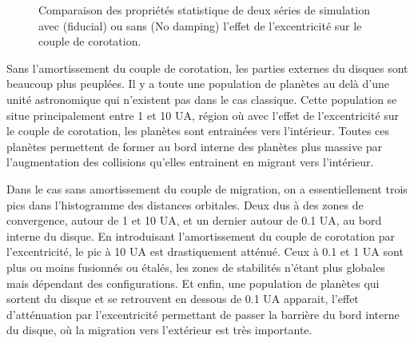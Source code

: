 \begin{figure}[htb]
\centering
{}\hfill
{}
\caption{Comparaison des propriétés statistique de deux séries de simulation avec (fiducial) ou sans (No damping) l'effet de l'excentricité sur le couple de corotation.}\label{fig:HSE_no_damping}
\end{figure}

Sans l'amortissement du couple de corotation, les parties externes du disques sont beaucoup plus peuplées. Il y a toute une population de planètes au delà d'une unité astronomique qui n'existent pas dans le cas classique. Cette population se situe principalement entre 1 et 10 UA, région où avec l'effet de l'excentricité sur le couple de corotation, les planètes sont entrainées vers l'intérieur. Toutes ces planètes permettent de former au bord interne des planètes plus massive par l'augmentation des collisions qu'elles entrainent en migrant vers l'intérieur. 

Dans le cas sans amortissement du couple de migration, on a essentiellement trois pics dans l'histogramme des distances orbitales. Deux dus à des zones de convergence, autour de 1 et 10 UA, et un dernier autour de 0.1 UA, au bord interne du disque. En introduisant l'amortissement du couple de corotation par l'excentricité, le pic à 10 UA est drastiquement atténué. Ceux à 0.1 et 1 UA sont plus ou moins fusionnés ou étalés, les zones de stabilités n'étant plus globales mais dépendant des configurations. Et enfin, une population de planètes qui sortent du disque et se retrouvent en dessous de 0.1 UA apparait, l'effet d'atténuation par l'excentricité permettant de passer la barrière du bord interne du disque, où la migration vers l'extérieur est très importante.

